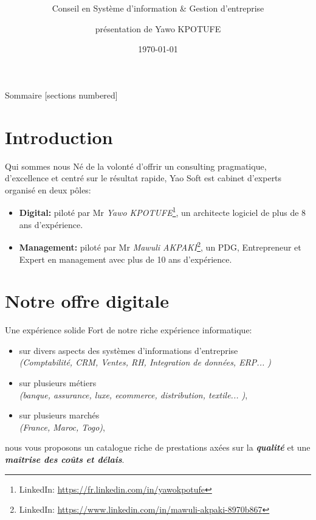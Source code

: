 \documentclass[10pt,french]{beamer}
\title{\YS\ }
\subtitle{Conseil en Système d'information \& Gestion d'entreprise}
\date{\today}
\author{présentation de Yawo KPOTUFE}
\institute{Architecte - Expert logiciel}
\newcommand{\itsm}[1]{\textit{{\scriptsize #1}}}
\begin{document}
\maketitle

\begin{frame}{Sommaire}
  [sections numbered]
  \tableofcontents[hideallsubsections]
\end{frame}

\section{Introduction}

\begin{frame}[fragile]{Qui sommes nous \?}
Né de la volonté d'offrir un consulting pragmatique, d'excellence et centré sur le résultat rapide,
Yao Soft est cabinet d'experts organisé en deux pôles:
\begin{itemize}
\item {\textbf{Digital:} 
\footnotesize{piloté par Mr \textsf{\textit{Yawo KPOTUFE}}\footnote{LinkedIn: \href{https://fr.linkedin.com/in/yawokpotufe}{https://fr.linkedin.com/in/yawokpotufe}
}, un architecte logiciel de plus de 8 ans d'expérience.}}

\item {\textbf{Management:}   
\footnotesize{piloté par Mr \textsf{\textit{Mawuli AKPAKI}}\footnote{LinkedIn: \href{https://www.linkedin.com/in/mawuli-akpaki-8970b867}{https://www.linkedin.com/in/mawuli-akpaki-8970b867}
}, un PDG, Entrepreneur et Expert en management avec plus de 10 ans d'expérience.}}

\end{itemize}
 
\end{frame}

\section{Notre offre digitale}
\begin{frame}[fragile]{Une expérience solide}
 Fort de notre riche expérience informatique:
 \begin{itemize}
 	\item sur divers aspects des systèmes d'informations d'entreprise \\ \itsm{(Comptabilité, CRM, Ventes, RH, Integration de données, ERP... )}
 	\item sur plusieurs métiers \\ {\itsm{(banque, assurance, luxe, ecommerce, distribution, textile... )}},
 	\item sur plusieurs marchés\\  \itsm{(France, Maroc, Togo)},
 \end{itemize}
 nous vous proposons un catalogue riche de prestations axées sur la \emph{\textbf{qualité}} et une \emph{\textbf{maîtrise des coûts et délais}}.
  
\end{frame}
\end{document}
